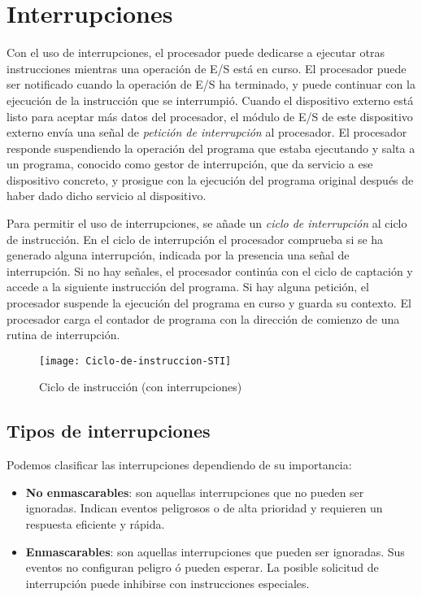 \section{Interrupciones}

Con el uso de interrupciones, el procesador puede dedicarse a ejecutar otras instrucciones mientras una operación de E/S está en curso. El procesador puede ser notificado cuando la operación de E/S ha terminado, y puede continuar con la ejecución de la instrucción que se interrumpió.
Cuando el dispositivo externo está listo para aceptar más datos del procesador, el módulo de E/S de este dispositivo externo envía una señal de \textit{petición de interrupción} al procesador. El procesador responde suspendiendo la operación del programa que estaba ejecutando y salta a un programa, conocido como gestor de interrupción, que da servicio a ese dispositivo concreto, y prosigue con la ejecución del programa original después de haber dado dicho servicio al dispositivo.

Para permitir el uso de interrupciones, se añade un \textit{ciclo de interrupción} al ciclo de instrucción. En el ciclo de interrupción el procesador comprueba si se ha generado alguna interrupción, indicada por la presencia una señal de interrupción. Si no hay señales, el procesador continúa con el ciclo de captación y accede a la siguiente instrucción del programa. Si hay alguna petición, el procesador suspende la ejecución del programa en curso y guarda su contexto. El procesador carga el contador de programa con la dirección de comienzo de una rutina de interrupción.

\begin{figure}[h]
  \centering
  \texttt{[image: Ciclo-de-instruccion-STI]}
  \caption{Ciclo de instrucción (con interrupciones)}
\end{figure}

\subsection{Tipos de interrupciones}

Podemos clasificar las interrupciones dependiendo de su importancia:

\begin{itemize}
  \item \textbf{No enmascarables}: son aquellas interrupciones que no pueden ser ignoradas. Indican eventos peligrosos o de alta prioridad y requieren un respuesta eficiente y rápida.
  \item \textbf{Enmascarables}: son aquellas interrupciones que pueden ser ignoradas. Sus eventos no configuran peligro ó pueden esperar. La posible solicitud de interrupción puede inhibirse con instrucciones especiales.
\end{itemize}

